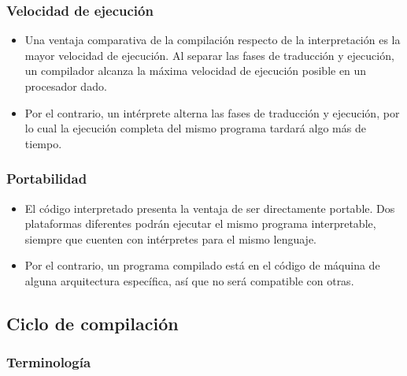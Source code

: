\documentclass[spanish,A4,]{article}
\begin{document}
\subsubsection{Velocidad de ejecución}\label{velocidad-de-ejecuciuxf3n}

\begin{itemize}
\itemsep1pt\parskip0pt
\item
  Una ventaja comparativa de la compilación respecto de la
  interpretación es la mayor velocidad de ejecución. Al separar las
  fases de traducción y ejecución, un compilador alcanza la máxima
  velocidad de ejecución posible en un procesador dado.
\item
  Por el contrario, un intérprete alterna las fases de traducción y
  ejecución, por lo cual la ejecución completa del mismo programa
  tardará algo más de tiempo.
\end{itemize}

\subsubsection{Portabilidad}\label{portabilidad}

\begin{itemize}
\itemsep1pt\parskip0pt
\item
  El código interpretado presenta la ventaja de ser directamente
  portable. Dos plataformas diferentes podrán ejecutar el mismo programa
  interpretable, siempre que cuenten con intérpretes para el mismo
  lenguaje.
\item
  Por el contrario, un programa compilado está en el código de máquina
  de alguna arquitectura específica, así que no será compatible con
  otras.
\end{itemize}

\subsection{Ciclo de compilación}\label{ciclo-de-compilaciuxf3n}

\subsubsection{Terminología}\label{terminologuxeda}
\end{document}
